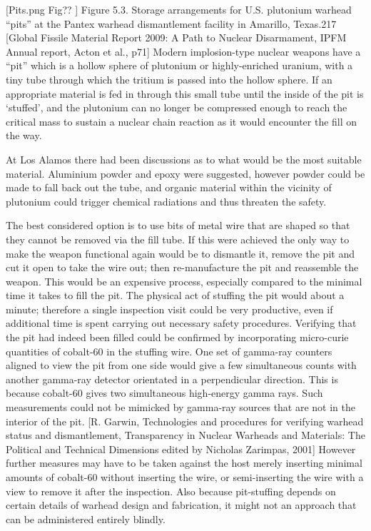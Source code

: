\documentclass[twoside,titlepage,11pt,twocolumn,a4paper]{article}
\begin{document}
[Pits.png Fig?? ] Figure 5.3. Storage arrangements for U.S. plutonium
warhead ``pits'' at the Pantex warhead dismantlement facility in
Amarillo, Texas.217 [Global Fissile Material Report 2009: A Path to
  Nuclear Disarmament, IPFM Annual report, Acton et al., p71] Modern
implosion-type nuclear weapons have a ``pit'' which is a hollow sphere
of plutonium or highly-enriched uranium, with a tiny tube through
which the tritium is passed into the hollow sphere. If an appropriate
material is fed in through this small tube until the inside of the pit
is ‘stuffed’, and the plutonium can no longer be compressed enough to
reach the critical mass to sustain a nuclear chain reaction as it
would encounter the fill on the way.

At Los Alamos there had been discussions as to what would be the most
suitable material. Aluminium powder and epoxy were suggested, however
powder could be made to fall back out the tube, and organic material
within the vicinity of plutonium could trigger chemical radiations and
thus threaten the safety.

The best considered option is to use bits of metal wire that are
shaped so that they cannot be removed via the fill tube.  If this were
achieved the only way to make the weapon functional again would be to
dismantle it, remove the pit and cut it open to take the wire out;
then re-manufacture the pit and reassemble the weapon. This would be an
expensive process, especially compared to the minimal time it takes to
fill the pit.  The physical act of stuffing the pit would about a
minute; therefore a single inspection visit could be very productive,
even if additional time is spent carrying out necessary safety
procedures.  Verifying that the pit had indeed been filled could be
confirmed by incorporating micro-curie quantities of cobalt-60 in the
stuffing wire. One set of gamma-ray counters aligned to view the pit
from one side would give a few simultaneous counts with another
gamma-ray detector orientated in a perpendicular direction.  This is
because cobalt-60 gives two simultaneous high-energy gamma rays. Such
measurements could not be mimicked by gamma-ray sources that are not
in the interior of the pit.  [R. Garwin, Technologies and procedures
  for verifying warhead status and dismantlement, Transparency in
  Nuclear Warheads and Materials: The Political and Technical
  Dimensions edited by Nicholas Zarimpas, 2001] However further
measures may have to be taken against the host merely inserting
minimal amounts of cobalt-60 without inserting the wire, or
semi-inserting the wire with a view to remove it after the
inspection. Also because pit-stuffing depends on certain details of
warhead design and fabrication, it might not an approach that can be
administered entirely blindly.
\end{document}
